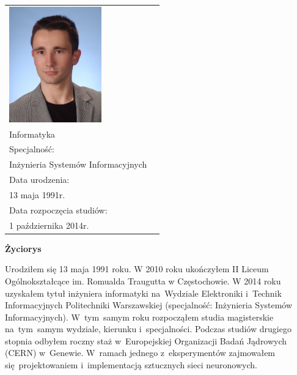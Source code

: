 \newpage\thispagestyle{empty}
  \begin{tabular}{p{4.5cm} p{8cm}}
      \begin{minipage}{4.5cm}
           \vspace{-\baselineskip}
           \includegraphics[height=5cm, width=4cm]{img/author-photo.jpg}
      \end{minipage}
      &
      \begin{minipage}{8cm}
          Kierunek: \\[\smallskipamount]
          {\large Informatyka}\\[0.2cm]
          Specjalność: \\[\smallskipamount]
          {\large Inżynieria Systemów Informacyjnych}\\[0.2cm]
          Data urodzenia: \\[\smallskipamount]
          {\large 13 maja 1991r.}\\[0.2cm]
          Data rozpoczęcia studiów: \\[\smallskipamount]
          {\large 1 października 2014r.}
      \end{minipage}
  \end{tabular}
  \vspace*{1\baselineskip}
  \begin{center}
  {\large\bfseries Życiorys}\par\bigskip
  \end{center}
  Urodziłem się 13 maja 1991 roku. W 2010 roku ukończyłem II Liceum Ogólnokształcące
  im. Romualda Traugutta w Częstochowie. W 2014 roku uzyskałem tytuł inżyniera informatyki na~Wydziale Elektroniki
  i~Technik Informacyjnych Politechniki Warszawskiej (specjalność: Inżynieria Systemów Informacyjnych).
  W~tym~samym roku rozpocząłem studia magisterskie na~tym~samym wydziale, kierunku i~specjalności.
  Podczas studiów drugiego stopnia odbyłem roczny staż w~Europejskiej Organizacji Badań Jądrowych (CERN) w~Genewie.
  W~ramach jednego z~eksperymentów zajmowałem się~projektowaniem i~implementacją sztucznych sieci neuronowych.

